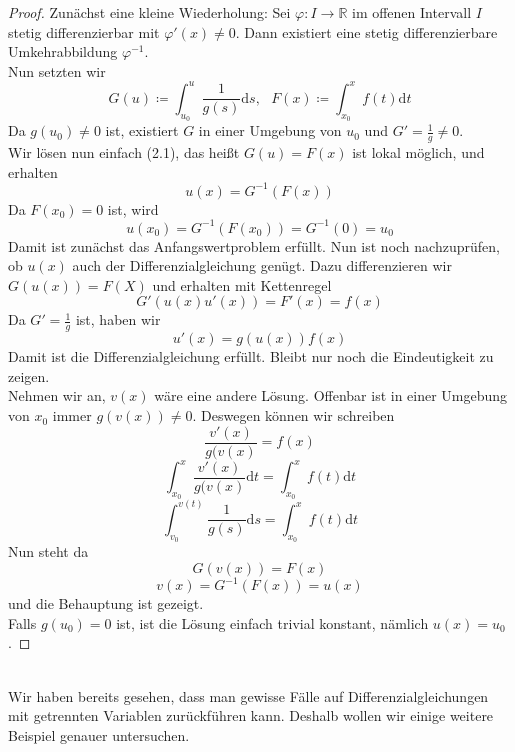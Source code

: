 \begin{proof}
Zunächst eine kleine Wiederholung: Sei $\varphi:I\rightarrow
\mathbb{R}$ im offenen Intervall $I$ stetig differenzierbar mit 
$\varphi'(x)\neq 0$. Dann existiert eine stetig differenzierbare 
Umkehrabbildung $\varphi^{-1}$. \\
Nun setzten wir
\begin{equation*}
G(u)\coloneqq\int_{u_0}^u\frac{1}{g(s)}\mathrm{d}s, \ \ \
F(x)\coloneqq\int_{x_0}^x f(t) \mathrm{d}t
\end{equation*}
Da $g(u_0)\neq 0$ ist, existiert $G$ in einer Umgebung von $u_0$ 
und $G'=\frac{1}{g}\neq 0$. \\
Wir lösen nun einfach (2.1), das heißt $G(u)=F(x)$ ist lokal 
möglich, und erhalten
\begin{equation*}
u(x)=G^{-1}\left(F(x)\right)
\end{equation*}
Da $F(x_0)=0$ ist, wird
\begin{equation*}
u(x_0) = G^{-1} \left( F(x_0) \right) =G^{-1}(0)=u_0
\end{equation*}
Damit ist zunächst das Anfangswertproblem erfüllt. Nun ist noch 
nachzuprüfen, ob $u(x)$ auch der Differenzialgleichung genügt.
Dazu differenzieren wir $G\left(u(x)\right)=F(X)$ und erhalten 
mit Kettenregel
\begin{equation*}
G'\left(u(x)u'(x)\right)=F'(x)=f(x)
\end{equation*}
Da $G'=\frac{1}{g}$ ist, haben wir
\begin{equation*}
u'(x)=g\left(u(x)\right)f(x)
\end{equation*}
Damit ist die Differenzialgleichung erfüllt. Bleibt nur noch
die Eindeutigkeit zu zeigen.\\
Nehmen wir an, $v(x)$ wäre eine andere Lösung. Offenbar ist 
in einer Umgebung von $x_0$ immer $g(v(x))\neq 0$. Deswegen 
können wir schreiben
\begin{equation*}
\frac{v'(x)}{g(v(x)}=f(x)
\end{equation*}
\begin{equation*}
\int_{x_0}^x\frac{v'(x)}{g(v(x)}\mathrm{d}t = 
\int_{x_0}^xf(t)\mathrm{d}t
\end{equation*}
\begin{equation*}
\int_{v_0}^{v(t)}\frac{1}{g(s)}\mathrm{d}s = 
\int_{x_0}^xf(t)\mathrm{d}t
\end{equation*}
Nun steht da
\begin{equation*}
G(v(x))=F(x)
\end{equation*}
\begin{equation*}
v(x)=G^{-1}(F(x))=u(x)
\end{equation*}
und die Behauptung ist gezeigt.\\
Falls $g(u_0)=0$ ist, ist die Lösung einfach trivial konstant, 
nämlich $u(x)=u_0$.
\end{proof}
\ \\
\linebreak
Wir haben bereits gesehen, dass man gewisse Fälle auf 
Differenzialgleichungen mit getrennten Variablen zurückführen 
kann. Deshalb wollen wir einige weitere Beispiel genauer 
untersuchen.\\
\linebreak


